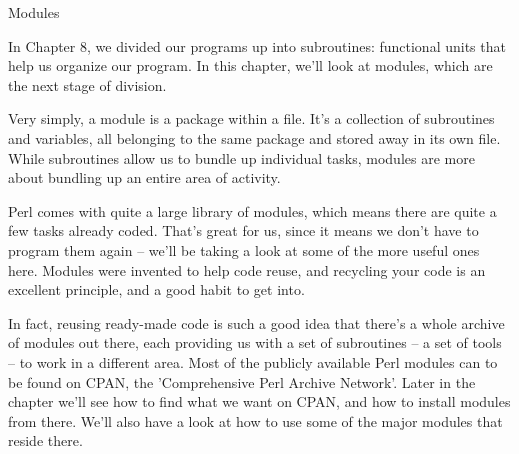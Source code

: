 \documentclass[a4paper,11pt]{book}
\begin{document}

\noindent 

\noindent 

\noindent 

\noindent 

\noindent 

\noindent 

\noindent 

\noindent 

\noindent 

\noindent 

\noindent 

\noindent 

\noindent 

\noindent 

\noindent 

\noindent Modules

\noindent 

\noindent 

\noindent 

\noindent 

\noindent In Chapter 8, we divided our programs up into subroutines: functional units that help us organize our program. In this chapter, we'll look at modules, which are the next stage of division.

\noindent 

\noindent Very simply, a module is a package within a file. It's a collection of subroutines and variables, all belonging to the same package and stored away in its own file. While subroutines allow us to bundle up individual tasks, modules are more about bundling up an entire area of activity.

\noindent 

\noindent Perl comes with quite a large library of modules, which means there are quite a few tasks already coded. That's great for us, since it means we don't have to program them again -- we'll be taking a look at some of the more useful ones here. Modules were invented to help code reuse, and recycling your code is an excellent principle, and a good habit to get into.

\noindent 

\noindent In fact, reusing ready-made code is such a good idea that there's a whole archive of modules out there, each providing us with a set of subroutines -- a set of tools -- to work in a different area. Most of the publicly available Perl modules can to be found on CPAN, the 'Comprehensive Perl Archive Network'. Later in the chapter we'll see how to find what we want on CPAN, and how to install modules from there. We'll also have a look at how to use some of the major modules that reside there.
\end{document}
